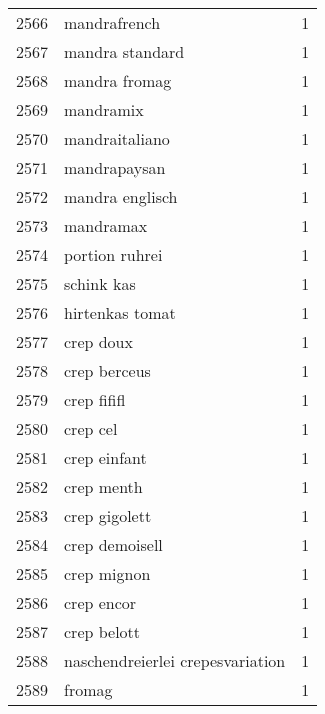 \begin{tabular}{llr}
2566 &                                       mandrafrench &      1 \\
2567 &                                    mandra standard &      1 \\
2568 &                                      mandra fromag &      1 \\
2569 &                                          mandramix &      1 \\
2570 &                                     mandraitaliano &      1 \\
2571 &                                       mandrapaysan &      1 \\
2572 &                                    mandra englisch &      1 \\
2573 &                                          mandramax &      1 \\
2574 &                                     portion ruhrei &      1 \\
2575 &                                         schink kas &      1 \\
2576 &                                    hirtenkas tomat &      1 \\
2577 &                                          crep doux &      1 \\
2578 &                                       crep berceus &      1 \\
2579 &                                        crep fififl &      1 \\
2580 &                                           crep cel &      1 \\
2581 &                                       crep einfant &      1 \\
2582 &                                         crep menth &      1 \\
2583 &                                      crep gigolett &      1 \\
2584 &                                     crep demoisell &      1 \\
2585 &                                        crep mignon &      1 \\
2586 &                                         crep encor &      1 \\
2587 &                                        crep belott &      1 \\
2588 &                   naschendreierlei crepesvariation &      1 \\
2589 &                                             fromag &      1 \\

\end{tabular}
